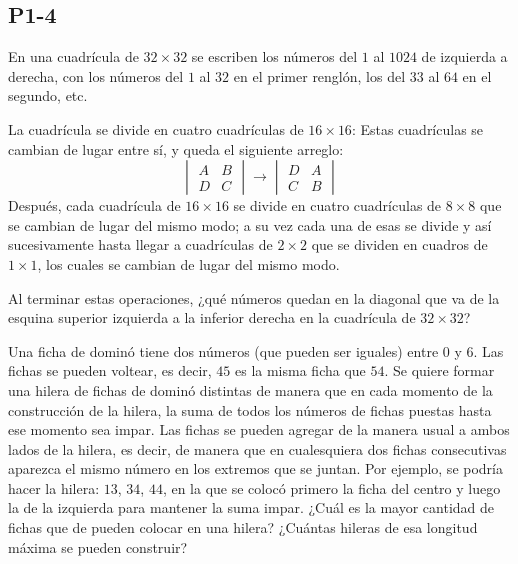 \documentclass[11pt]{scrartcl}
\begin{document}
\subsection{P1-4}
\begin{problem}
    [2002/1]
    En una cuadrícula de $32\times 32$ se escriben los números del $1$ al $1024$ de izquierda a derecha, con los números del $1$ al $32$ en el primer renglón, los del $33$ al $64$ en el segundo, etc. 

La cuadrícula se divide en cuatro cuadrículas de $16\times 16$:
 \newline 
Estas cuadrículas se cambian de lugar entre sí, y queda el siguiente arreglo:
\[\begin{vmatrix}A&B\\D&C\end{vmatrix}\to\begin{vmatrix}D&A\\C&B\end{vmatrix}\]
Después, cada cuadrícula de $16\times 16$ se divide en cuatro cuadrículas de $8\times 8$ que se cambian de lugar del mismo modo; a su vez cada una de esas se divide y así sucesivamente hasta llegar a cuadrículas de $2\times 2$ que se dividen en cuadros de $1\times 1$, los cuales se cambian de lugar del mismo modo.

Al terminar estas operaciones, ¿qué números quedan en la diagonal que va de la esquina superior izquierda a la inferior derecha en la cuadrícula de $32\times 32$?
\end{problem}
\begin{problem}
    [2002/4]
    Una ficha de dominó tiene dos números (que pueden ser iguales) entre $0$ y $6$. Las fichas se pueden voltear, es decir, $\boxed 4\boxed 5$ es la misma ficha que $\boxed 5\boxed 4$. Se quiere formar una hilera de fichas de dominó distintas de manera que en cada momento de la construcción de la hilera, la suma de todos los números de fichas puestas hasta ese momento sea impar. Las fichas se pueden agregar de la manera usual a ambos lados de la hilera, es decir, de manera que en cualesquiera dos fichas consecutivas aparezca el mismo número en los extremos que se juntan. Por ejemplo, se podría hacer la hilera: $\boxed 1\boxed 3$, $\boxed 3\boxed 4$, $\boxed 4\boxed 4$, en la que se colocó primero la ficha del centro y luego la de la izquierda para mantener la suma impar.
¿Cuál es la mayor cantidad de fichas que de pueden colocar en una hilera?
¿Cuántas hileras de esa longitud máxima se pueden construir?
\end{problem}
\end{document}
